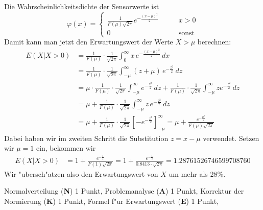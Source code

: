 \begin{loesung}
Die Wahrscheinlichkeitsdichte der Sensorwerte ist
\[
\varphi(x)=\begin{cases}
\displaystyle
\frac1{F(\mu)\sqrt{2\pi}}e^{-\frac{(x-\mu)^2}2}&\qquad x > 0\\
0&\qquad\text{sonst}
\end{cases}
\]
Damit kann man jetzt den Erwartungswert der Werte $X>\mu$ berechnen:
\begin{align*}
E(X| X > 0)
&=
\frac1{F(\mu)}\cdot\frac1{\sqrt{2\pi}}\int_0^\infty x\,e^{-\frac{(x-\mu)^2}2}\,dx
\\
&=
\frac1{F(\mu)}\cdot\frac1{\sqrt{2\pi}}\int_{-\mu}^\infty (z+\mu)\,e^{-\frac{z^2}2}\,dz
\\
&=
\mu\cdot \frac{1}{F(\mu)}\cdot\frac1{\sqrt{2\pi}}\int_{-\mu}^\infty e^{-\frac{z^2}2}\,dz
+
\frac1{F(\mu)}\cdot\frac1{\sqrt{2\pi}}\int_{-\mu}^\infty ze^{-\frac{z^2}2}\,dz
\\
&=
\mu + \frac1{F(\mu)}\cdot\frac1{\sqrt{2\pi}}\int_{-\mu}^\infty z\,e^{-\frac{z^2}2}\,dz
\\
&=
\mu + \frac1{F(\mu)}
\cdot\frac1{\sqrt{2\pi}}
\left[
-e^{-\frac{z^2}2}
\right]_{-\mu}^\infty
=\mu + \frac{e^{-\frac{\mu^2}2}}{F(\mu)\sqrt{2\pi}}
\end{align*}
Dabei haben wir im zweiten Schritt die Substitution $z=x-\mu$ verwendet.
Setzen wir $\mu=1$ ein, bekommen wir
\begin{align*}
E(X|X>0)
&
=
1+\frac{e^{-\frac12}}{F(1)\sqrt{2\pi}}
=
1+\frac{e^{-\frac12}}{0.8413\cdot \sqrt{2\pi}}=1.28761526746599708760
\end{align*}
Wir "ubersch"atzen also den Erwartungswert von $X$ um mehr als 28\%.
\end{loesung}

\begin{bewertung}
Normalverteilung ({\bf N}) 1 Punkt,
Problemanalyse ({\bf A}) 1 Punkt,
Korrektur der Normierung ({\bf K}) 1 Punkt,
Formel f"ur Erwartungswert ({\bf E}) 1 Punkt,
\end{bewertung}
